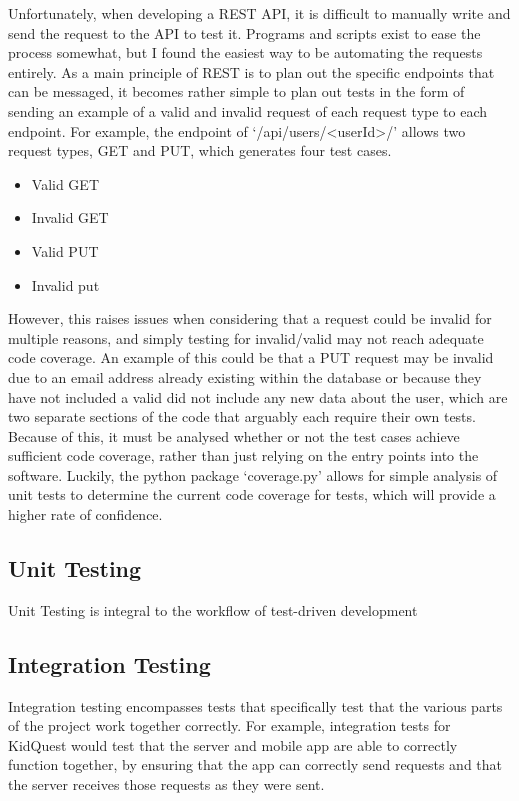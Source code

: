 Unfortunately, when developing a REST API, it is difficult to manually write and send the request to the API to test it.
Programs and scripts exist to ease the process somewhat, but I found the easiest way to be automating the requests entirely. 
As a main principle of REST is to plan out the specific endpoints that can be messaged, it becomes rather simple to plan out tests in the form of sending an example of a valid and invalid request of each request type to each endpoint.
For example, the endpoint of `/api/users/<userId>/' allows two request types, GET and PUT, which generates four test cases.
\begin{itemize}
	\item{Valid GET}
	\item{Invalid GET}
	\item{Valid PUT}
	\item{Invalid put}
\end{itemize}  
However, this raises issues when considering that a request could be invalid for multiple reasons, and simply testing for invalid/valid may not reach adequate code coverage.
An example of this could be that a PUT request may be invalid due to an email address already existing within the database or because they have not included a valid did not include any new data about the user, which are two separate sections of the code that arguably each require their own tests.
Because of this, it must be analysed whether or not the test cases achieve sufficient code coverage, rather than just relying on the entry points into the software.
Luckily, the python package `coverage.py' allows for simple analysis of unit tests to determine the current code coverage for tests, which will provide a higher rate of confidence.

\subsection{Unit Testing} 
Unit Testing is integral to the workflow of test-driven development

\subsection{Integration Testing}
Integration testing encompasses tests that specifically test that the various parts of the project work together correctly.
For example, integration tests for KidQuest would test that the server and mobile app are able to correctly function together, by ensuring that the app can correctly send requests and that the server receives those requests as they were sent.


